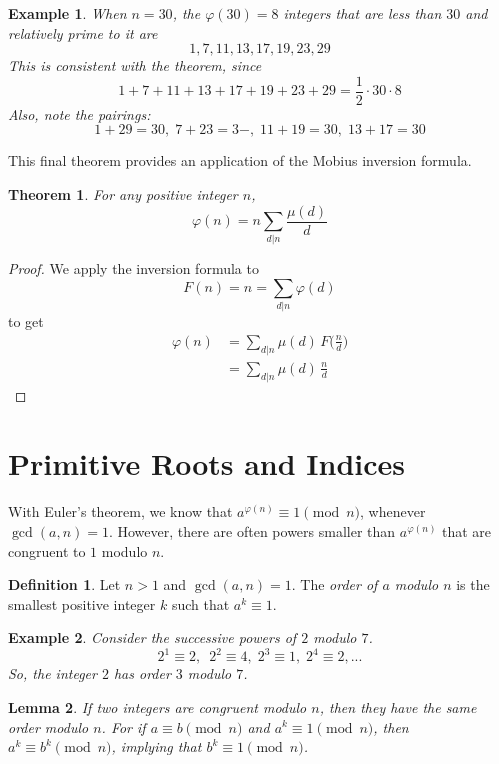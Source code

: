 \documentclass{article}
\newtheorem{theorem}{Theorem}[section]
\newtheorem{lemma}[theorem]{Lemma}
\newtheorem{example}{Example}[section]
\theoremstyle{remark}
\theoremstyle{definition}
\newtheorem{definition}{Definition}[section]
\begin{document}
\begin{example}
When $n = 30$, the $\varphi(30) = 8$ integers that are less than $30$ and relatively prime to it are
\[1, 7, 11, 13, 17, 19, 23, 29\]
This is consistent with the theorem, since 
\[1+7+11+13+17+19+23+29=\frac{1}{2} \cdot 30 \cdot 8\]
Also, note the pairings: 
\[1+29=30, \; 7+23=3-, \; 11+19=30, \; 13+17=30\]
\end{example}

This final theorem provides an application of the Mobius inversion formula. 

\begin{theorem}
For any positive integer $n$, 
\[\varphi(n) = n \sum_{d|n} \frac{\mu(d)}{d}\]
\end{theorem}
\begin{proof}
We apply the inversion formula to
\[F(n) = n = \sum_{d|n} \varphi(d)\]
to get
\begin{align*}
    \varphi(n) & = \sum_{d|n} \mu(d) \,F \bigg( \frac{n}{d} \bigg) \\
    & = \sum_{d|n} \mu(d) \, \frac{n}{d}
\end{align*}
\end{proof}

\section{Primitive Roots and Indices}

With Euler's theorem, we know that $a^{\varphi(n)} \equiv 1 \pmod{n}$, whenever $\gcd(a, n) = 1$. However, there are often powers smaller than $a^{\varphi(n)}$ that are congruent to $1$ modulo $n$. 

\begin{definition}
Let $n>1$ and $\gcd(a, n) = 1$. The \textit{order of $a$ modulo $n$} is the smallest positive integer $k$ such that $a^k \equiv 1$. 
\end{definition}

\begin{example}
Consider the successive powers of $2$ modulo $7$. 
\[2^1 \equiv 2, \;\ 2^2 \equiv 4, \; 2^3 \equiv 1, \; 2^4 \equiv 2, ... \]
So, the integer $2$ has order $3$ modulo $7$. 
\end{example}

\begin{lemma}
If two integers are congruent modulo $n$, then they have the same order modulo $n$. For if $a \equiv b \pmod{n}$ and $a^k \equiv 1 \pmod{n}$, then $a^k \equiv b^k \pmod{n}$, implying that $b^k \equiv 1 \pmod{n}$. 
\end{lemma}
\end{document}
